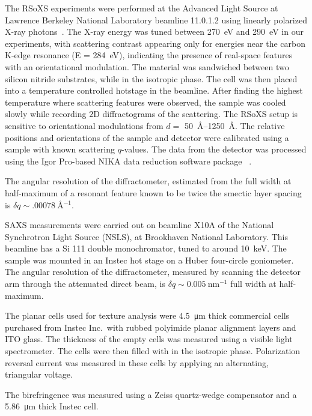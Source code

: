 \documentclass[superscriptaddress,floatfix,onecolumn,notitlepage]{revtex4-1}
\begin{document}
The RSoXS experiments were performed at the Advanced Light Source at Lawrence
Berkeley National Laboratory beamline 11.0.1.2 using linearly polarized X-ray
photons~\cite{wang2011defining, liu2016resonant}. The X-ray energy was tuned
between \SI{270}{\eV} and \SI{290}{\electronvolt} in our experiments, with
scattering contrast appearing only for energies near the carbon K-edge resonance (E =
\SI{284}{\electronvolt}), indicating the presence of real-space features with an orientational modulation.
The  material was sandwiched between two silicon nitride substrates,
while in the isotropic phase. The cell was then placed into a temperature
controlled hotstage in the beamline.
After finding the highest temperature where scattering features were observed,
the sample was cooled slowly while recording $2$D diffractograms of the scattering. The
RSoXS setup is sensitive to orientational modulations from $d=$ \SIrange{50}{1250}{\angstrom}. The relative positions and orientations of the sample and detector were calibrated using a
sample with known scattering $q$-values. The data from the detector was processed using the
Igor Pro-based NIKA data reduction software package~ \cite{ilavsky2012nika, zhang2010glassy}.

The angular resolution of the diffractometer, estimated from the full width at
half-maximum of a resonant feature known to be twice the smectic layer spacing
is $\delta q \sim \SI{.00078}{\angstrom^{-1}}$.

SAXS measurements were carried out on beamline X10A of the National Synchrotron
Light Source (NSLS), at Brookhaven National Laboratory. This beamline has a Si 111 double monochromator, tuned to around \SI{10}{\kilo\electronvolt}. The sample was mounted in an Instec hot stage on a Huber four-circle goniometer.
%
The angular resolution of the diffractometer, measured by scanning the detector arm
through the attenuated direct beam, is $\delta q \sim
\SI{0.005}{\nano\metre^{-1}}$ full width at half-maximum.

The planar cells used for texture analysis were \SI{4.5}{\micro\metre} thick commercial cells purchased from Instec Inc.\ with rubbed polyimide planar alignment layers and ITO glass. The thickness of the empty cells was measured using a visible light spectrometer. The cells were then filled with  in the isotropic phase.  Polarization reversal current was measured in these cells by applying an alternating, triangular voltage.

The birefringence was measured using a Zeiss quartz-wedge compensator and a
\SI{5.86}{\micro\metre} thick Instec cell.
\end{document}
